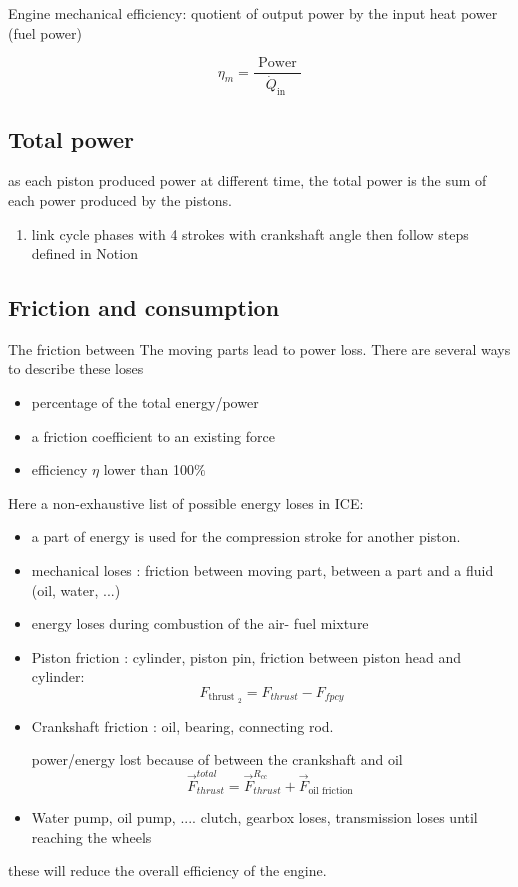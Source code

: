 \documentclass[12pt,a4paper]{article}
\begin{document}
	Engine mechanical efficiency: quotient of output power by the input heat power (fuel power)
		
	\begin{equation*}
		\eta_{m}=\frac{\text { Power }}{\dot{Q}_{\text {in }}} \tag{9}
	\end{equation*}
	\subsection{Total power}
	as each piston produced power at different time, the total power is the sum of each power produced by the pistons. 
	
	\begin{enumerate}
		\item link cycle phases with 4 strokes with crankshaft angle then follow steps defined in Notion
	\end{enumerate}
	
	\subsection{Friction and consumption}
	The friction between The moving parts lead to power loss. 
	There are several ways to describe these loses 
	\begin{itemize}
		\item percentage of the total energy/power
		\item a friction coefficient to an existing force
		\item efficiency $\eta$ lower than 100$\%$
	\end{itemize}
	
	Here a non-exhaustive list of possible energy loses in ICE:
	\begin{itemize}
		\item a part of energy is used for the compression stroke for another piston. 
		\item mechanical loses : friction between moving part, between a part and a fluid (oil, water, ...)
		\item energy loses during combustion of the air- fuel mixture
		\item Piston friction : cylinder, piston pin,
		friction between piston head and cylinder:
	\begin{equation*}
		F_{\text {thrust }_{2}}=F_{thrust }-F_{fpcy} \tag{4}
	\end{equation*}
		\item Crankshaft friction : oil, bearing, connecting rod.
		
		power/energy lost because of between the crankshaft and oil
		\begin{equation*}
			\vec{F}_{thrust}^{total}=\vec{F}_{thrust}^{R_{c c}}+\vec{F}_{\text{oil friction }} \tag{6}
		\end{equation*}
		\item Water pump, oil pump, .... clutch, gearbox loses, transmission loses until reaching the wheels
	\end{itemize}
	these will reduce the overall efficiency of the engine.
	
\end{document}
